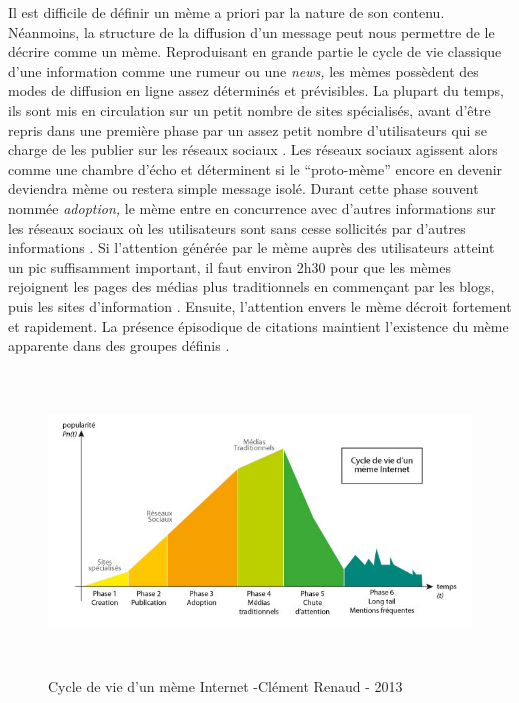 Il est difficile de définir un mème a priori par la nature de son contenu. Néanmoins, la structure de la diffusion d{\textquoteright}un message peut nous permettre de le décrire comme un mème. Reproduisant en grande partie le cycle de vie classique d{\textquoteright}une information comme une rumeur ou une \textit{news, }les mèmes possèdent des modes de diffusion en ligne assez déterminés et prévisibles. La plupart du temps, ils sont mis en circulation sur un petit nombre de sites spécialisés, avant d{\textquoteright}être repris dans une première phase par un assez petit nombre d{\textquoteright}utilisateurs qui se charge de les publier sur les réseaux sociaux \citep{Bauckhage2011}. Les réseaux sociaux agissent alors comme une chambre d{\textquoteright}écho et déterminent si le {\textquotedblleft}proto-mème{\textquotedblright} encore en devenir deviendra mème ou restera simple message isolé. Durant cette phase souvent nommée \textit{adoption,} le mème entre en concurrence avec d{\textquoteright}autres informations sur les réseaux sociaux o\`u les utilisateurs sont sans cesse sollicités par d{\textquoteright}autres informations \citep{Davenport2001}. Si l{\textquoteright}attention générée par le mème auprès des utilisateurs atteint un pic suffisamment important, il faut environ 2h30 pour que les mèmes rejoignent les pages des médias plus traditionnels en commen\c{c}ant par les blogs, puis les sites d{\textquoteright}information \citep{Leskovec2009}. Ensuite, l{\textquoteright}attention envers le mème décroit fortement et rapidement. La présence épisodique de citations maintient l{\textquoteright}existence du mème apparente dans des groupes définis \citep{Buchel2012}.

\begin{figure}[htpb]
    \centering
    \includegraphics[width=6.2559in,height=3.1559in]{figures/chap2/chapitre2-img2.jpg}
    \caption[Cycle de vie d{\textquoteright}un mème Internet]{Cycle de vie d{\textquoteright}un mème Internet -Clément Renaud - 2013}
    \label{fig:meme-lifecycle}
\end{figure}

